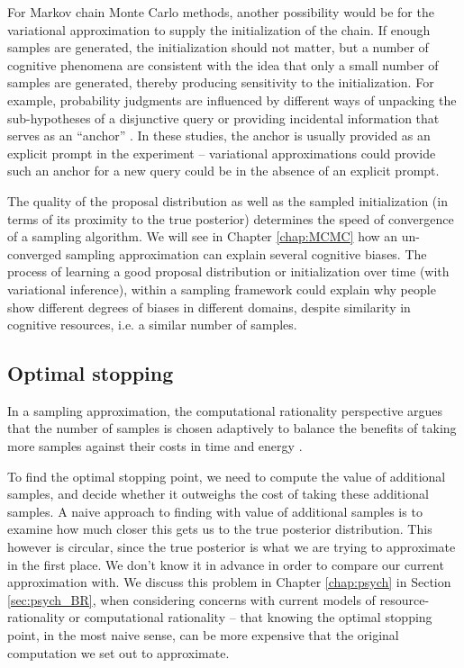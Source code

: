 For Markov chain Monte Carlo methods, another possibility would be for the variational approximation to supply the initialization of the chain. If enough samples are generated, the initialization should not matter, but a number of cognitive phenomena are consistent with the idea that only a small number of samples are generated, thereby producing sensitivity to the initialization. For example, probability judgments are influenced by different ways of unpacking the sub-hypotheses of a disjunctive query \citep{dasgupta2017hypotheses} or providing incidental information that serves as an ``anchor'' \citep{lieder2017anchoring,lieder2018empirical}. In these studies, the anchor is usually provided as an explicit prompt in the experiment -- variational approximations could provide such an anchor for a new query could be in the absence of an explicit prompt.

The quality of the proposal distribution as well as the sampled initialization (in terms of its proximity to the true posterior) determines the speed of convergence of a sampling algorithm. We will see in Chapter \ref{chap:MCMC} how an un-converged sampling approximation can explain several cognitive biases. The process of learning a good proposal distribution or initialization over time (with variational inference), within a sampling framework could explain why people show different degrees of biases in different domains, despite similarity in cognitive resources, i.e. a similar number of samples.

\subsection{Optimal stopping}
\label{sec:MCMC_optimal_stop}

In a sampling approximation, the computational rationality perspective argues that the number of samples is chosen adaptively to balance the benefits of taking more samples against their costs in time and energy \citep{Gershman2015,Vul2014,griffiths2015}. 

To find the optimal stopping point, we need to compute the value of additional samples, and decide whether it outweighs the cost of taking these additional samples. A naive approach to finding with value of additional samples is to examine how much closer this gets us to the true posterior distribution. This however is circular, since the true posterior is what we are trying to approximate in the first place. We don't know it in advance in order to compare our current approximation with. We discuss this problem in Chapter \ref{chap:psych} in Section \ref{sec:psych_BR}, when considering concerns with current models of resource-rationality or computational rationality -- that knowing the optimal stopping point, in the most naive sense, can be more expensive that the original computation we set out to approximate. 

